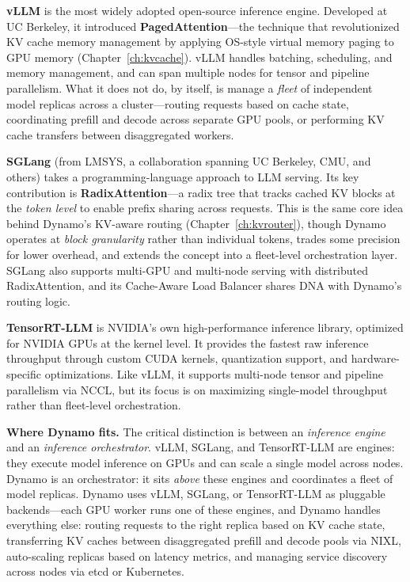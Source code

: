 \textbf{vLLM}\hspace{1em} is the most widely adopted open-source inference engine. Developed at UC Berkeley, it introduced \textbf{PagedAttention}---the technique that revolutionized KV cache memory management by applying OS-style virtual memory paging to GPU memory (Chapter~\ref{ch:kvcache}). vLLM handles batching, scheduling, and memory management, and can span multiple nodes for tensor and pipeline parallelism. What it does not do, by itself, is manage a \emph{fleet} of independent model replicas across a cluster---routing requests based on cache state, coordinating prefill and decode across separate GPU pools, or performing KV cache transfers between disaggregated workers.

\textbf{SGLang}\hspace{1em} (from LMSYS, a collaboration spanning UC Berkeley, CMU, and others) takes a programming-language approach to LLM serving. Its key contribution is \textbf{RadixAttention}---a radix tree that tracks cached KV blocks at the \emph{token level} to enable prefix sharing across requests. This is the same core idea behind Dynamo's KV-aware routing (Chapter~\ref{ch:kvrouter}), though Dynamo operates at \emph{block granularity} rather than individual tokens, trades some precision for lower overhead, and extends the concept into a fleet-level orchestration layer. SGLang also supports multi-GPU and multi-node serving with distributed RadixAttention, and its Cache-Aware Load Balancer shares DNA with Dynamo's routing logic.

\textbf{TensorRT-LLM}\hspace{1em} is NVIDIA's own high-performance inference library, optimized for NVIDIA GPUs at the kernel level. It provides the fastest raw inference throughput through custom CUDA kernels, quantization support, and hardware-specific optimizations. Like vLLM, it supports multi-node tensor and pipeline parallelism via NCCL, but its focus is on maximizing single-model throughput rather than fleet-level orchestration.

\textbf{Where Dynamo fits.}\hspace{1em} The critical distinction is between an \emph{inference engine} and an \emph{inference orchestrator}. vLLM, SGLang, and TensorRT-LLM are engines: they execute model inference on GPUs and can scale a single model across nodes. Dynamo is an orchestrator: it sits \emph{above} these engines and coordinates a fleet of model replicas. Dynamo uses vLLM, SGLang, or TensorRT-LLM as pluggable backends---each GPU worker runs one of these engines, and Dynamo handles everything else: routing requests to the right replica based on KV cache state, transferring KV caches between disaggregated prefill and decode pools via NIXL, auto-scaling replicas based on latency metrics, and managing service discovery across nodes via etcd or Kubernetes.

